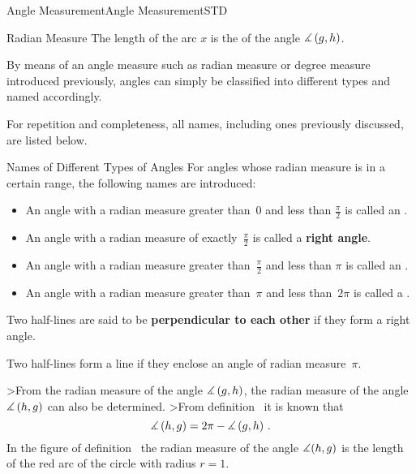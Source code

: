 \begin{MXContent}{Angle Measurement}{Angle Measurement}{STD}
\begin{MXInfo}{Radian Measure}
The length of the arc $x$ is the  of the
angle $\measuredangle \left( g, h \right)$.
\end{MXInfo}

By means of an angle measure such as radian measure or degree measure 
introduced previously, angles can simply be classified into different types and named 
accordingly. 

For repetition and completeness, all names, including ones previously discussed, are listed 
below.

\begin{MXInfo}{Names of Different Types of Angles}
For angles whose radian measure is in a certain range, the following names 
are introduced:

\begin{itemize}
\item
An angle with a radian measure greater than~$0$ and less than $\frac{\pi}{2}$ is called an
.
       
\item
An angle with a radian measure of exactly~$\frac{\pi}{2}$ is called a \textbf{right angle}.
  
\item
An angle with a radian measure greater than~$\frac{\pi}{2}$ and less than $\pi$ is called 
an .
       
\item
An angle with a radian measure greater than~$\pi$ and less than~$2 \pi$ is called
a .
\end{itemize}

Two half-lines are said to be \textbf{perpendicular to each other} if they form a right angle.

Two half-lines form a line if they enclose an angle of radian measure~$\pi$.
\end{MXInfo}

>From the radian measure of the angle $\measuredangle \left( g, h \right)$, the 
radian measure of the angle $\measuredangle \left( h, g \right)$  can also be determined. 
>From definition~ it is known that
\[
   \Mmeasuredangle \left( h, g \right)
 = 2 \pi - \Mmeasuredangle \left( g, h \right)\,. %
\]
In the figure of definition~ the radian measure 
of the angle $\measuredangle(h,g)$ is the length of the red arc of the circle 
with radius $r = 1$.



\end{MXContent}

